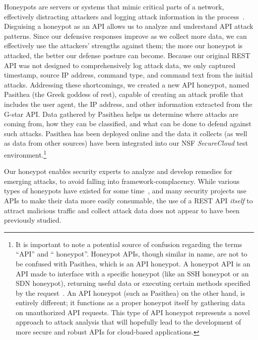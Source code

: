 Honeypots are servers or systems that mimic critical parts of a network, effectively distracting attackers and logging attack information in the process~\cite{honeypot-Def}.
Disguising a honeypot as an API allows us to analyze and understand API attack patterns.
Since our defensive responses improve as we collect more data, we can effectively use the attackers' strengths against them; the more our honeypot is attacked, the better our defense posture can become.
Because our original REST API was not designed to comprehensively log attack data, we only captured timestamp, source IP address, command type, and command text from the initial attacks.  
Addressing these shortcomings, we created a new API honeypot, named Pasithea (the Greek goddess of rest), capable of creating an attack profile that includes the user agent, the IP address, and other information extracted from the G-star API.
Data gathered by Pasithea helps us determine where attacks are coming from, how they can be classified, and what can be done to defend against such attacks.  
Pasithea has been deployed online and the data it collects (as well as data from other sources) have been integrated into our NSF {\em SecureCloud} test environment.\footnote{  
It is important to note a potential source of confusion regarding the terms ``API'' and `` honeypot''. 
Honeypot APIs, though similar in name, are not to be confused with Pasithea, which is an API honeypot. 
A honeypot API is an API made to interface with a specific honeypot (like an SSH honeypot or an SDN honeypot), returning useful data or executing certain methods specified by the request~\cite{Honeypot-API}. 
An API honeypot (such as Pasithea) on the other hand, is entirely different; it functions as a proper honeypot itself by gathering data on unauthorized API requests.  
This type of API honeypot represents a novel approach to attack analysis that will hopefully lead to the development of more secure and robust APIs for cloud-based applications.}  

Our honeypot enables security experts to analyze and develop remedies for emerging attacks, to avoid falling into framework-complacency.  
While various types of honeypots have existed for some time~\cite{Stoll:1989:CET:67554,Provos:2004:VHF:1251375.1251376}, and many security projects use APIs to make their data more easily consumable,
the use of a REST API {\em itself} to attract malicious traffic and collect attack data does not appear to have been previously studied.

